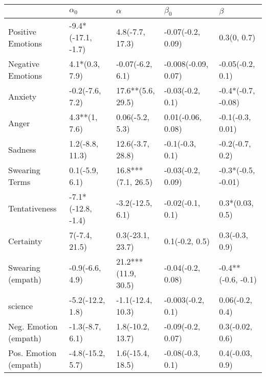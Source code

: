 \begin{tabular}{lllll}
\toprule
{} &          $\alpha_0$ &             $\alpha$ &            $\beta_0$ &             $\beta$ \\
\midrule
Positive Emotions     &  -9.4*(-17.1, -1.7) &      4.8(-7.7, 17.3) &    -0.07(-0.2, 0.09) &         0.3(0, 0.7) \\
Negative Emotions     &      4.1*(0.3, 7.9) &     -0.07(-6.2, 6.1) &  -0.008(-0.09, 0.07) &    -0.05(-0.2, 0.1) \\
Anxiety               &     -0.2(-7.6, 7.2) &    17.6**(5.6, 29.5) &     -0.03(-0.2, 0.1) &  -0.4*(-0.7, -0.08) \\
Anger                 &       4.3**(1, 7.6) &      0.06(-5.2, 5.3) &    0.01(-0.06, 0.08) &    -0.1(-0.3, 0.01) \\
Sadness               &     1.2(-8.8, 11.3) &     12.6(-3.7, 28.8) &      -0.1(-0.3, 0.1) &     -0.2(-0.7, 0.2) \\
Swearing Terms        &      0.1(-5.9, 6.1) &   16.8***(7.1, 26.5) &    -0.03(-0.2, 0.09) &  -0.3*(-0.5, -0.01) \\
Tentativeness         &  -7.1*(-12.8, -1.4) &     -3.2(-12.5, 6.1) &     -0.02(-0.1, 0.1) &     0.3*(0.03, 0.5) \\
Certainty             &       7(-7.4, 21.5) &     0.3(-23.1, 23.7) &       0.1(-0.2, 0.5) &      0.3(-0.3, 0.9) \\
Swearing (empath)     &     -0.9(-6.6, 4.9) &  21.2***(11.9, 30.5) &    -0.04(-0.2, 0.08) &  -0.4**(-0.6, -0.1) \\
science               &    -5.2(-12.2, 1.8) &    -1.1(-12.4, 10.3) &    -0.003(-0.2, 0.1) &     0.06(-0.2, 0.4) \\
Neg. Emotion (empath) &     -1.3(-8.7, 6.1) &     1.8(-10.2, 13.7) &    -0.09(-0.2, 0.07) &     0.3(-0.02, 0.6) \\
Pos. Emotion (empath) &    -4.8(-15.2, 5.7) &     1.6(-15.4, 18.5) &     -0.08(-0.3, 0.1) &     0.4(-0.03, 0.9) \\
\bottomrule
\end{tabular}
